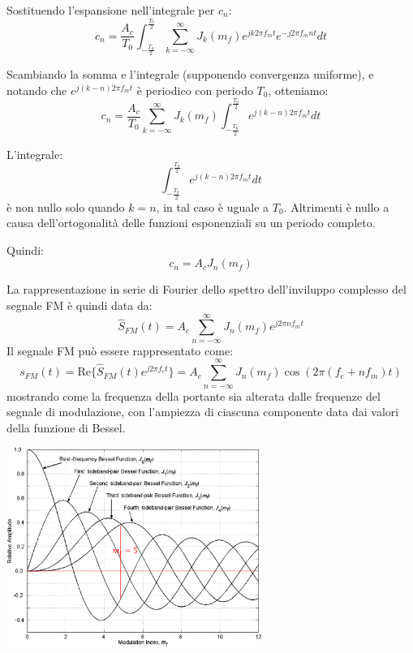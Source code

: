 Sostituendo l'espansione nell'integrale per \( c_n \):
\[ c_n = \frac{A_c}{T_0} \int_{-\frac{T_0}{2}}^{\frac{T_0}{2}} \sum_{k=-\infty}^\infty J_k(m_f) e^{j k 2\pi f_m t} e^{-j 2\pi f_m n t} dt \]

Scambiando la somma e l'integrale (supponendo convergenza uniforme), e notando che \( e^{j (k-n) 2\pi f_m t} \) è periodico con periodo \( T_0 \), otteniamo:
\[ c_n = \frac{A_c}{T_0} \sum_{k=-\infty}^\infty J_k(m_f) \int_{-\frac{T_0}{2}}^{\frac{T_0}{2}} e^{j (k-n) 2\pi f_m t} dt \]



L'integrale:
\[ \int_{-\frac{T_0}{2}}^{\frac{T_0}{2}} e^{j (k-n) 2\pi f_m t} dt \]
è non nullo solo quando \( k = n \), in tal caso è uguale a \( T_0 \). Altrimenti è nullo a causa dell'ortogonalità delle funzioni esponenziali su un periodo completo.


Quindi:
\[ c_n = A_c J_n(m_f) \]





La rappresentazione in serie di Fourier dello spettro dell'inviluppo complesso del segnale FM è quindi data da:
\[
\hat{S}_{FM}(t) = A_c \sum_{n=-\infty}^{\infty} J_n(m_f) e^{j 2\pi n f_m t}
\]
Il segnale FM può essere rappresentato come:
\[
s_{FM}(t) = \text{Re}\{ \hat{S}_{FM}(t) e^{j 2\pi f_c t} \} = A_c \sum_{n=-\infty}^{\infty} J_n(m_f) \cos(2\pi (f_c + n f_m) t)
\]
mostrando come la frequenza della portante sia alterata dalle frequenze del segnale di modulazione, con l'ampiezza di ciascuna componente data dai valori della funzione di Bessel.
\begin{center}
    \includegraphics[width=0.625\textwidth]{imgs/bessel1.png}
\end{center}


